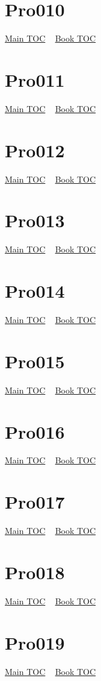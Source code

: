 \documentclass{book}
\begin{document}
  \section{Pro010}\hyperlink{toc}{Main TOC} ~ \hyperref[subsec:Pro]{Book TOC} 
  \section{Pro011}\hyperlink{toc}{Main TOC} ~ \hyperref[subsec:Pro]{Book TOC} 
  \section{Pro012}\hyperlink{toc}{Main TOC} ~ \hyperref[subsec:Pro]{Book TOC} 
  \section{Pro013}\hyperlink{toc}{Main TOC} ~ \hyperref[subsec:Pro]{Book TOC} 
  \section{Pro014}\hyperlink{toc}{Main TOC} ~ \hyperref[subsec:Pro]{Book TOC} 
  \section{Pro015}\hyperlink{toc}{Main TOC} ~ \hyperref[subsec:Pro]{Book TOC} 
  \section{Pro016}\hyperlink{toc}{Main TOC} ~ \hyperref[subsec:Pro]{Book TOC} 
  \section{Pro017}\hyperlink{toc}{Main TOC} ~ \hyperref[subsec:Pro]{Book TOC} 
  \section{Pro018}\hyperlink{toc}{Main TOC} ~ \hyperref[subsec:Pro]{Book TOC} 
  \section{Pro019}\hyperlink{toc}{Main TOC} ~ \hyperref[subsec:Pro]{Book TOC} 
\end{document}
